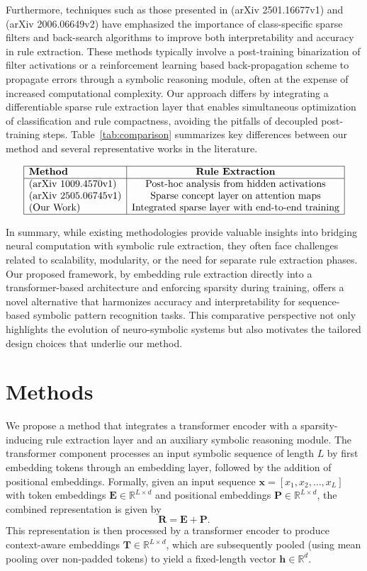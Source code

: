 \documentclass{article}
\begin{document}
Furthermore, techniques such as those presented in (arXiv 2501.16677v1) and (arXiv 2006.06649v2) have emphasized the importance of class-specific sparse filters and back-search algorithms to improve both interpretability and accuracy in rule extraction. These methods typically involve a post-training binarization of filter activations or a reinforcement learning based back-propagation scheme to propagate errors through a symbolic reasoning module, often at the expense of increased computational complexity. Our approach differs by integrating a differentiable sparse rule extraction layer that enables simultaneous optimization of classification and rule compactness, avoiding the pitfalls of decoupled post-training steps. Table~\ref{tab:comparison} summarizes key differences between our method and several representative works in the literature.

\[
\begin{array}{|l|c|c|}
\hline
\textbf{Method} & \textbf{Rule Extraction}\\
\hline
\text{(arXiv 1009.4570v1)} & \text{Post-hoc analysis from hidden activations}\\
\text{(arXiv 2505.06745v1)} & \text{Sparse concept layer on attention maps}\\
\text{(Our Work)} & \text{Integrated sparse layer with end-to-end training}\\
\hline
\end{array}
\]

In summary, while existing methodologies provide valuable insights into bridging neural computation with symbolic rule extraction, they often face challenges related to scalability, modularity, or the need for separate rule extraction phases. Our proposed framework, by embedding rule extraction directly into a transformer-based architecture and enforcing sparsity during training, offers a novel alternative that harmonizes accuracy and interpretability for sequence-based symbolic pattern recognition tasks. This comparative perspective not only highlights the evolution of neuro-symbolic systems but also motivates the tailored design choices that underlie our method.

\section{Methods}
We propose a method that integrates a transformer encoder with a sparsity-inducing rule extraction layer and an auxiliary symbolic reasoning module. The transformer component processes an input symbolic sequence of length \(L\) by first embedding tokens through an embedding layer, followed by the addition of positional embeddings. Formally, given an input sequence \(\mathbf{x} = [x_1, x_2, \dots, x_L]\) with token embeddings \(\mathbf{E} \in \mathbb{R}^{L \times d}\) and positional embeddings \(\mathbf{P} \in \mathbb{R}^{L \times d}\), the combined representation is given by
\[
\mathbf{R} = \mathbf{E} + \mathbf{P}.
\]
This representation is then processed by a transformer encoder to produce context-aware embeddings \(\mathbf{T} \in \mathbb{R}^{L \times d}\), which are subsequently pooled (using mean pooling over non-padded tokens) to yield a fixed-length vector \( \mathbf{h} \in \mathbb{R}^d \).
\end{document}
